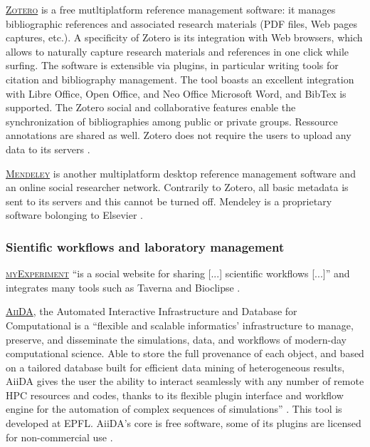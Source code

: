 \vspace{0.4cm}

\noindent {} \textsc{\href{https://www.zotero.org/}{Zotero}} is a free mutltiplatform reference management software: it manages bibliographic references and associated research materials (PDF files, Web pages captures, etc.). A specificity of Zotero is its integration with Web browsers, which allows to naturally capture research materials and references in one click while surfing. The software is extensible via plugins, in particular writing tools for citation and bibliography management. The tool boasts an excellent integration with Libre Office, Open Office, and Neo Office Microsoft Word, and BibTex is supported. The Zotero social and collaborative features enable the synchronization of bibliographies among public or private groups. Ressource annotations are shared as well. Zotero does not require the users to upload any data to its servers \cite{zotero.org_zotero_2015}.

\vspace{0.4cm}

\noindent {} \textsc{\href{https://www.mendeley.com/}{Mendeley}} is another multiplatform desktop reference management software and an online social researcher network. Contrarily to Zotero, all basic metadata is sent to its servers and this cannot be turned off. Mendeley is a proprietary software bolonging to Elsevier \cite{mendeley.com_mendeley_2015}. 

\subsubsection{Sientific workflows and laboratory management}

\noindent {} \textsc{\href{http://www.myexperiment.org}{myExperiment}} ``is a social website for sharing [...] scientific workflows [...]'' and integrates many tools such as Taverna and Bioclipse \cite{myexperiment_myexperiment_2014,myexperiment.org_myexperiment_2015}.

\vspace{0.4cm}

\noindent {}  \textsc{\href{http://www.aiida.net/}{AiiDA}}, the Automated Interactive Infrastructure and Database for Computational is a ``flexible and scalable informatics' infrastructure to manage, preserve, and disseminate the simulations, data, and workflows of modern-day computational science. Able to store the full provenance of each object, and based on a tailored database built for efficient data mining of heterogeneous results, AiiDA gives the user the ability to interact seamlessly with any number of remote HPC resources and codes, thanks to its flexible plugin interface and workflow engine for the automation of complex sequences of simulations'' \cite{aiida.net_aiida_2015}. This tool is developed at EPFL. AiiDA's core is free software, some of its plugins are licensed for non-commercial use \cite{pizzi_aiida:_2015}.

